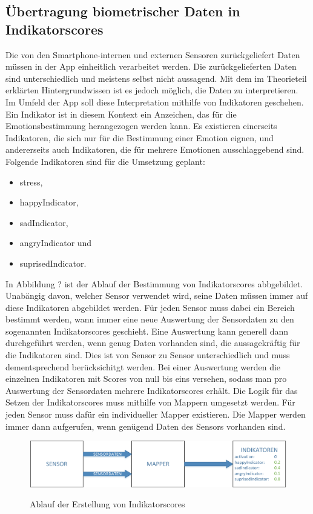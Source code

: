 \subsection{Übertragung biometrischer Daten in Indikatorscores}
Die von den Smartphone-internen und externen Sensoren zurückgeliefert Daten müssen in der App einheitlich verarbeitet werden. Die zurückgelieferten Daten sind unterschiedlich und meistens selbst nicht aussagend. Mit dem im Theorieteil erklärten Hintergrundwissen ist es jedoch möglich, die Daten zu interpretieren. \newline 
Im Umfeld der App soll diese Interpretation mithilfe von Indikatoren geschehen. Ein Indikator ist in diesem Kontext ein Anzeichen, das für die Emotionsbestimmung herangezogen werden kann. Es existieren einerseits Indikatoren, die sich nur für die Bestimmung einer Emotion eignen, und andererseits auch Indikatoren, die für mehrere Emotionen ausschlaggebend sind. Folgende Indikatoren sind für die Umsetzung geplant: 
\begin{itemize}[noitemsep, topsep=0pt]
	\item stress,
	\item happyIndicator,
	\item sadIndicator,
    \item angryIndicator und
    \item suprisedIndicator.
\end{itemize}
In Abbildung ? ist der Ablauf der Bestimmung von Indikatorscores abbgebildet. Unabängig davon, welcher Sensor verwendet wird, seine Daten müssen immer auf diese Indikatoren abgebildet werden. Für jeden Sensor muss dabei ein Bereich bestimmt werden, wann immer eine neue Auswertung der Sensordaten zu den sogenannten Indikatorscores geschieht. Eine Auswertung kann generell dann durchgeführt werden, wenn genug Daten vorhanden sind, die aussagekräftig für die Indikatoren sind. Dies ist von Sensor zu Sensor unterschiedlich und muss dementsprechend berücksichitgt werden. \newline
Bei einer Auswertung werden die einzelnen Indikatoren mit Scores von null bis eins versehen, sodass man pro Auswertung der Sensordaten mehrere Indikatorscores erhält. Die Logik für das Setzen der Indikatorscores muss mithilfe von Mappern umgesetzt werden. Für jeden Sensor muss dafür ein individueller Mapper existieren. Die Mapper werden immer dann aufgerufen, wenn genügend Daten des Sensors vorhanden sind. \newline
\begin{figure}[h]
	\centering
	\includegraphics[width=16cm]{Bilder/indicatorscore.png}
	\label{img:Ablauf Erstellung Indicatorscores}
	\caption[Ablauf der Erstellung von Indikatorscores]{Ablauf der Erstellung von Indikatorscores}
\end{figure}%
